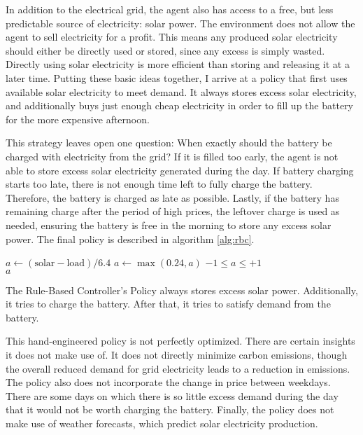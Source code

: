 In addition to the electrical grid, the agent also has access to a free, but less predictable source of electricity: solar power.
The environment does not allow the agent to sell electricity for a profit.
This means any produced solar electricity should either be directly used or stored, since any excess is simply wasted. Directly using solar electricity is more efficient than storing and releasing it at a later time.
Putting these basic ideas together, I arrive at a policy that first uses available solar electricity to meet demand.
It always stores excess solar electricity, and additionally buys just enough cheap electricity in order to fill up the battery for the more expensive afternoon.

This strategy leaves open one question:
When exactly should the battery be charged with electricity from the grid?
If it is filled too early, the agent is not able to store excess solar electricity generated during the day.
If battery charging starts too late, there is not enough time left to fully charge the battery. Therefore, the battery is charged as late as possible.
Lastly, if the battery has remaining charge after the period of high prices, the leftover charge is used as needed, ensuring the battery is free in the morning to store any excess solar power.
The final policy is described in algorithm \ref{alg:rbc}.

\begin{algorithm}[h]
    \begin{algorithmic}
        \State $a \gets (\text{solar} - \text{load})/6.4$ 
            \State $a \gets \max(0.24, a)$ 
        \EndIf
        \Ensure $-1 \leq a \leq +1$ \\
        \Return $a$
    \end{algorithmic}
    \caption{The Rule-Based Controller's Policy always stores excess solar power. Additionally, it tries to charge the battery. After that, it tries to satisfy demand from the battery.}
    \label{alg:rbc}
\end{algorithm}

This hand-engineered policy is not perfectly optimized. There are certain insights it does not make use of. It does not directly minimize carbon emissions, though the overall reduced demand for grid electricity leads to a reduction in emissions.
The policy also does not incorporate the change in price between weekdays.
There are some days on which there is so little excess demand during the day that it would not be worth charging the battery.
Finally, the policy does not make use of weather forecasts, which predict solar electricity production.

